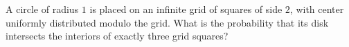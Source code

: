 A circle of radius $1$ is placed on an infinite grid of squares of side $2$, with center uniformly distributed modulo the grid. What is the probability that its disk intersects the interiors of exactly three grid squares?
